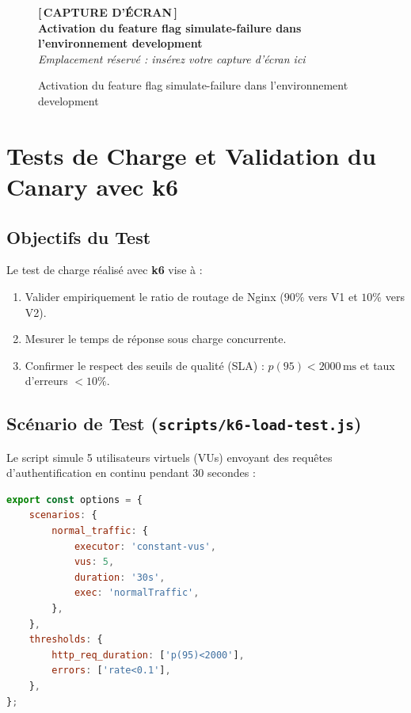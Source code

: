 \documentclass[12pt,a4paper]{article}
\newcommand{\screenshotplaceholder}[2][7cm]{%
  \begin{figure}[H]
    \centering
    \begin{tcolorbox}[
      width=0.95\textwidth,
      height=#1,
      valign=center,
      halign=center,
      colback=lightgray,
      colframe=secondaryblue!70,
      boxrule=1.5pt,
      dashed
    ]
      \centering
      \vspace{0.2cm}
      {\color{secondaryblue}\Huge\textbf{[\,CAPTURE D'ÉCRAN\,]}}\\[0.4cm]
      {\color{darkgray}\large\textbf{#2}}\\[0.2cm]
      {\small\textit{Emplacement réservé : insérez votre capture d'écran ici}}
      \vspace{0.2cm}
    \end{tcolorbox}
    \caption{#2}
    \label{fig:#2}
  \end{figure}
}
\begin{document}
\screenshotplaceholder[6cm]{Activation du feature flag simulate-failure dans l'environnement development}

\section{Tests de Charge et Validation du Canary avec k6}

\subsection{Objectifs du Test}
Le test de charge réalisé avec \textbf{k6} vise à :
\begin{enumerate}
    \item Valider empiriquement le ratio de routage de Nginx ($90\%$ vers V1 et $10\%$ vers V2).
    \item Mesurer le temps de réponse sous charge concurrente.
    \item Confirmer le respect des seuils de qualité (SLA) : $p(95) < 2000\,\text{ms}$ et taux d'erreurs $< 10\%$.
\end{enumerate}

\subsection{Scénario de Test (\texttt{scripts/k6-load-test.js})}
Le script simule 5 utilisateurs virtuels (VUs) envoyant des requêtes d'authentification en continu pendant 30 secondes :
\begin{lstlisting}[language=JavaScript]
export const options = {
    scenarios: {
        normal_traffic: {
            executor: 'constant-vus',
            vus: 5,
            duration: '30s',
            exec: 'normalTraffic',
        },
    },
    thresholds: {
        http_req_duration: ['p(95)<2000'],
        errors: ['rate<0.1'],
    },
};
\end{lstlisting}
\end{document}
